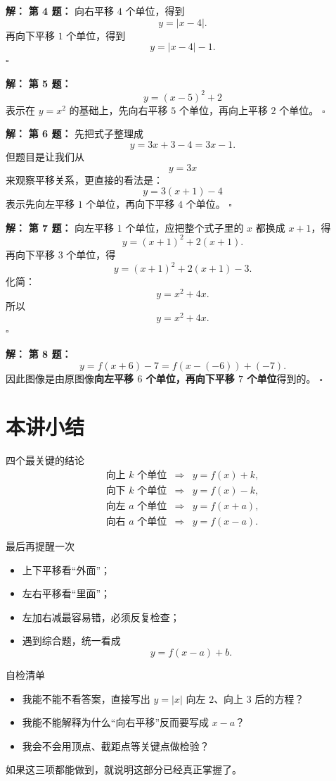\documentclass[11pt,a4paper,fontset=fandol]{ctexart}
\theoremstyle{formaltheorem}
\theoremstyle{formalexample}
\newenvironment{solution}{\par\noindent\textbf{解：}}{\hfill$\square$\par}
\begin{document}
\begin{solution}
\textbf{第 4 题：}
向右平移 $4$ 个单位，得到
\[
y=|x-4|.
\]
再向下平移 $1$ 个单位，得到
\[
\boxed{y=|x-4|-1}.
\]
\end{solution}

\begin{solution}
\textbf{第 5 题：}
\[
y=(x-5)^2+2
\]
表示在 $y=x^2$ 的基础上，先向右平移 $5$ 个单位，再向上平移 $2$ 个单位。
\end{solution}

\begin{solution}
\textbf{第 6 题：}
先把式子整理成
\[
y=3x+3-4=3x-1.
\]
但题目是让我们从
\[
y=3x
\]
来观察平移关系，更直接的看法是：
\[
y=3(x+1)-4
\]
表示先向左平移 $1$ 个单位，再向下平移 $4$ 个单位。
\end{solution}

\begin{solution}
\textbf{第 7 题：}
向左平移 $1$ 个单位，应把整个式子里的 $x$ 都换成 $x+1$，得
\[
y=(x+1)^2+2(x+1).
\]
再向下平移 $3$ 个单位，得
\[
y=(x+1)^2+2(x+1)-3.
\]
化简：
\[
y=x^2+4x.
\]
所以
\[
\boxed{y=x^2+4x}.
\]
\end{solution}

\begin{solution}
\textbf{第 8 题：}
\[
y=f(x+6)-7=f(x-(-6))+(-7).
\]
因此图像是由原图像\textbf{向左平移 $6$ 个单位，再向下平移 $7$ 个单位}得到的。
\end{solution}

\section{本讲小结}

\begin{goalbox}{四个最关键的结论}
\[
\begin{array}{rcl}
\text{向上 }k\text{ 个单位} &\Longrightarrow& y=f(x)+k,\\[0.4em]
\text{向下 }k\text{ 个单位} &\Longrightarrow& y=f(x)-k,\\[0.4em]
\text{向左 }a\text{ 个单位} &\Longrightarrow& y=f(x+a),\\[0.4em]
\text{向右 }a\text{ 个单位} &\Longrightarrow& y=f(x-a).
\end{array}
\]
\end{goalbox}

\begin{skillbox}{最后再提醒一次}
\begin{itemize}
  \item 上下平移看“外面”；
  \item 左右平移看“里面”；
  \item 左加右减最容易错，必须反复检查；
  \item 遇到综合题，统一看成
  \[
  y=f(x-a)+b.
  \]
\end{itemize}
\end{skillbox}

\begin{notebox}{自检清单}
\begin{itemize}
  \item 我能不能不看答案，直接写出 $y=|x|$ 向左 $2$、向上 $3$ 后的方程？
  \item 我能不能解释为什么“向右平移”反而要写成 $x-a$？
  \item 我会不会用顶点、截距点等关键点做检验？
\end{itemize}
如果这三项都能做到，就说明这部分已经真正掌握了。
\end{notebox}
\end{document}
